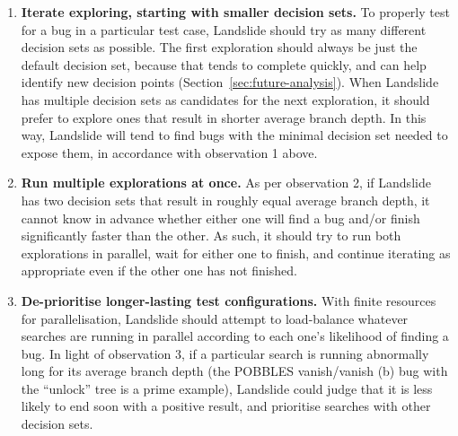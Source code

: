 \begin{enumerate}
	\item {\bf Iterate exploring, starting with smaller decision sets.} To properly test for a bug in a particular test case, Landslide should try as many different decision sets as possible.
	The first exploration should always be just the default decision set, because that tends to complete quickly, and can help identify new decision points (Section~\ref{sec:future-analysis}).
	When Landslide has multiple decision sets as candidates for the next exploration, it should prefer to explore ones that result in shorter average branch depth.
	In this way, Landslide will tend to find bugs with the minimal decision set needed to expose them, in accordance with observation 1 above.
	\item {\bf Run multiple explorations at once.}
	As per observation 2, if Landslide has two decision sets that result in roughly equal average branch depth, it cannot know in advance whether either one will find a bug and/or finish significantly faster than the other. As such, it should try to run both explorations in parallel, wait for either one to finish, and continue iterating as appropriate even if the other one has not finished.
	\item {\bf De-prioritise longer-lasting test configurations.}
	With finite resources for parallelisation, Landslide should attempt to load-balance whatever searches are running in parallel according to each one's likelihood of finding a bug.
	In light of observation 3, if a particular search is running abnormally long for its average branch depth (the POBBLES vanish/vanish (b) bug with the ``unlock'' tree is a prime example), Landslide could judge that it is less likely to end soon with a positive result, and prioritise searches with other decision sets.
\end{enumerate}

